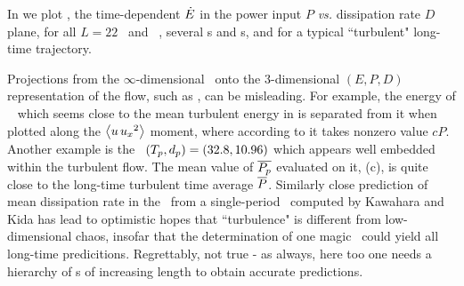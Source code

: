 In 
we plot , the time-dependent $\dot{E}$
in the
power input $P$ {\em vs.} %
dissipation rate $D$ %
plane, for all $L=22$ \eqva\ and
\reqva\ ,
several \po s and \rpo s, and for a typical ``turbulent"
long-time trajectory.

Projections 
from the $\infty$-dimensional \statesp\ onto 
the 3-dimensional
$(E,P,D)$ representation of the flow, such as
,
can be misleading.
For example, the energy of \reqva\  which
seems close to the
mean turbulent energy in  is separated
from it when plotted along the
$\left\langle {u \, u_{x}{}^2} \right\rangle$ moment, where according to 
 it takes nonzero value $c P$. 
Another example is the \rpo\ $({T_{p}},d_p) =(32.8,10.96)$
which appears well embedded within the turbulent flow.
The mean value of $\overline{P_p}$
evaluated on it,
(c),
is quite close to the long-time turbulent
time average $\overline{P}$.
Similarly close prediction of mean dissipation rate in the
\pCf\ from a single-period \po\ computed by
Kawahara and Kida has lead to 
optimistic hopes that ``turbulence" is different from
low-dimensional chaos, insofar that the determination of one 
magic \po\ could yield all long-time predicitions.
Regrettably, not true - as always, here too one needs a hierarchy
of \po s of increasing length to obtain accurate
predictions.

